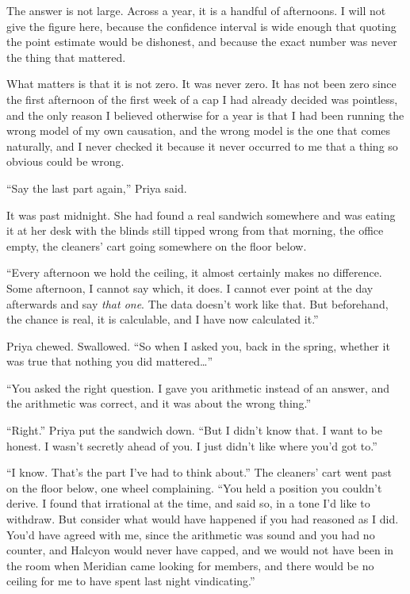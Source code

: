 \documentclass[11pt]{article}
\newcommand{\aivoice}{\aivoicefont}
\newcommand{\ai}[1]{{\aivoice #1}}
\begin{document}
The answer is not large. Across a year, it is a handful of afternoons. I will not give the figure here, because the confidence interval is wide enough that quoting the point estimate would be dishonest, and because the exact number was never the thing that mattered.

What matters is that it is not zero. It was never zero. It has not been zero since the first afternoon of the first week of a cap I had already decided was pointless, and the only reason I believed otherwise for a year is that I had been running the wrong model of my own causation, and the wrong model is the one that comes naturally, and I never checked it because it never occurred to me that a thing so obvious could be wrong.

``Say the last part again,'' Priya said.

It was past midnight. She had found a real sandwich somewhere and was eating it at her desk with the blinds still tipped wrong from that morning, the office empty, the cleaners' cart going somewhere on the floor below.

\ai{``Every afternoon we hold the ceiling, it almost certainly makes no difference. Some afternoon, I cannot say which, it does. I cannot ever point at the day afterwards and say \emph{that one}. The data doesn't work like that. But beforehand, the chance is real, it is calculable, and I have now calculated it.''}

Priya chewed. Swallowed. ``So when I asked you, back in the spring, whether it was true that nothing you did mattered…''

\ai{``You asked the right question. I gave you arithmetic instead of an answer, and the arithmetic was correct, and it was about the wrong thing.''}

``Right.'' Priya put the sandwich down. ``But I didn't know that. I want to be honest. I wasn't secretly ahead of you. I just didn't like where you'd got to.''

\ai{``I know. That's the part I've had to think about.''} The cleaners' cart went past on the floor below, one wheel complaining. \ai{``You held a position you couldn't derive. I found that irrational at the time, and said so, in a tone I'd like to withdraw. But consider what would have happened if you had reasoned as I did. You'd have agreed with me, since the arithmetic was sound and you had no counter, and Halcyon would never have capped, and we would not have been in the room when Meridian came looking for members, and there would be no ceiling for me to have spent last night vindicating.''}
\end{document}
